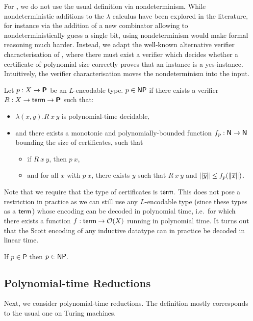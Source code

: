 For \NP{}, we do not use the usual definition via nondeterminism. While nondeterministic additions to the $\lambda$ calculus have been explored in the literature, for instance via the addition of a new combinator allowing to nondeterministically guess a single bit\cite{kutzner:nondet_lambda}, using nondeterminism would make formal reasoning much harder.
Instead, we adapt the well-known alternative verifier characterisation of \NP{}, where there must exist a verifier which decides whether a certificate of polynomial size correctly proves that an instance is a yes-instance. Intuitively, the verifier characterisation moves the nondeterminism into the input.
\begin{definition}[\NP{}]
  Let $p : X \rightarrow \textsf{\bfseries P}$ be an $L$-encodable type. $p \in \textsf{NP}{}$ if there exists a verifier $R : X \rightarrow \textsf{term} \rightarrow \textsf{\bfseries P}$ such that: 
  \begin{itemize}
    \item $\lambda (x, y). R~x~y$ is polynomial-time decidable, 
    \item and there exists a monotonic and polynomially-bounded function $f_p : \mathsf{N} \rightarrow \mathsf{N}$ bounding the size of certificates, such that
      \begin{itemize}
        \item if $R~x~y$, then $p~x$, 
        \item and for all $x$ with $p~x$, there exists $y$ such that $R~x~y$ and $\left\lVert\overline{y}\right\rVert \le f_p(\left\lVert\overline{x}\right\rVert)$.
      \end{itemize}
  \end{itemize}
\end{definition}

Note that we require that the type of certificates is $\textsf{term}$. This does not pose a restriction in practice as we can still use any $L$-encodable type (since these types as a $\textsf{term}$) whose encoding can be decoded in polynomial time, i.e.\ for which there exists a function $f : \textsf{term} \rightarrow \mathcal{O}{(X)}$ running in polynomial time. It turns out that the Scott encoding of any inductive datatype can in practice be decoded in linear time.

\begin{fact}
  If $p \in \textsf{P}$ then $p \in \textsf{NP}{}$. 
\end{fact}

\subsection{Polynomial-time Reductions}
Next, we consider polynomial-time reductions. The definition mostly corresponds to the usual one on Turing machines. 


